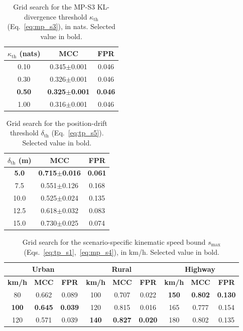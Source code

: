 \documentclass[12pt, a4paper]{report}
\begin{document}
\begin{table}[H]
\centering
\caption{Grid search for the MP-S3 KL-divergence threshold
$\kappa_{\mathrm{th}}$ (Eq.~\ref{eq:mp_s3}), in nats.
Selected value in bold.}
\label{tab:kl-sensitivity}
\renewcommand{\arraystretch}{1.2}
\begin{tabular}{|c|c|c|}
\hline
\textbf{$\kappa_{\mathrm{th}}$ (nats)} & \textbf{MCC} & \textbf{FPR} \\
\hline
0.10          & 0.345$\pm$0.001 & 0.046 \\
\hline
0.30          & 0.326$\pm$0.001 & 0.046 \\
\hline
\textbf{0.50} & \textbf{0.325$\pm$0.001} & \textbf{0.046} \\
\hline
1.00          & 0.316$\pm$0.001 & 0.046 \\
\hline
\end{tabular}
\end{table}

\begin{table}[H]
\centering
\caption{Grid search for the position-drift threshold $\delta_{\mathrm{th}}$
(Eq.~\ref{eq:tp_s5}). Selected value in bold.}
\label{tab:drift-sensitivity}
\renewcommand{\arraystretch}{1.2}
\begin{tabular}{|c|c|c|}
\hline
\textbf{$\delta_{\mathrm{th}}$ (m)} & \textbf{MCC} & \textbf{FPR} \\
\hline
\textbf{5.0}  & \textbf{0.715$\pm$0.016} & \textbf{0.061} \\
\hline
7.5           & 0.551$\pm$0.126 & 0.168 \\
\hline
10.0          & 0.525$\pm$0.024 & 0.135 \\
\hline
12.5          & 0.618$\pm$0.032 & 0.083 \\
\hline
15.0          & 0.730$\pm$0.025 & 0.074 \\
\hline
\end{tabular}
\end{table}

\begin{table}[H]
\centering
\caption{Grid search for the scenario-specific kinematic speed bound
$s_{\max}$ (Eqs.~\ref{eq:tp_s1},~\ref{eq:mp_s4}), in km/h.
Selected value in bold.}
\label{tab:smax-sensitivity}
\renewcommand{\arraystretch}{1.2}
\begin{tabular}{|c|c|c|c|c|c|c|c|c|}
\hline
\multicolumn{3}{|c|}{\textbf{Urban}} &
\multicolumn{3}{c|}{\textbf{Rural}} &
\multicolumn{3}{c|}{\textbf{Highway}} \\
\hline
\textbf{km/h} & \textbf{MCC} & \textbf{FPR} &
\textbf{km/h} & \textbf{MCC} & \textbf{FPR} &
\textbf{km/h} & \textbf{MCC} & \textbf{FPR} \\
\hline
80           & 0.662 & 0.089 & 100          & 0.707 & 0.022 & \textbf{150} & \textbf{0.802} & \textbf{0.130} \\
\hline
\textbf{100} & \textbf{0.645} & \textbf{0.039} & 120          & 0.815 & 0.016 & 165 & 0.777 & 0.154 \\
\hline
120          & 0.571 & 0.039 & \textbf{140} & \textbf{0.827} & \textbf{0.020} & 180 & 0.802 & 0.135 \\
\hline
\end{tabular}
\end{table}
\end{document}
